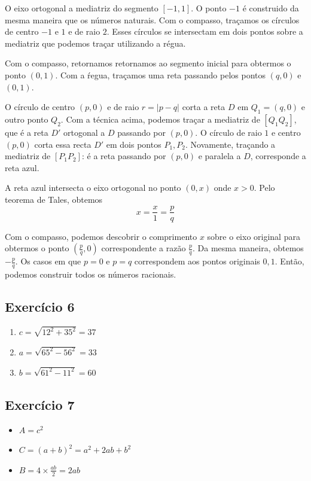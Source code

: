 O eixo ortogonal a mediatriz do segmento $[-1,1]$. O ponto $-1$ é construido da
mesma maneira que os números naturais. Com o compasso, traçamos os círculos de
centro $-1$ e $1$ e de raio $2$. Esses círculos se intersectam em dois pontos
sobre a mediatriz que podemos traçar utilizando a régua.

Com o compasso, retornamos retornamos ao segmento inicial para obtermos o ponto
$(0,1)$. Com a ŕegua, traçamos uma reta passando pelos pontos $(q,0)$ e $(0,1)$.

O círculo de centro $(p,0)$ e de raio $r=|p-q|$ corta a reta $D$ em
$Q_1={(q,0)}$ e outro ponto $Q_2$. Com a técnica acima, podemos traçar a
mediatriz de $[Q_1Q_2]$, que é a reta $D'$
ortogonal a $D$ passando por ${(p,0)}$. O círculo de raio $1$ e centro
$(p,0)$ corta essa recta $D'$ em dois pontos $P_1, P_2$. Novamente, traçando
a mediatriz de $[P_1P_2]$: é a reta passando por $(p,0)$ e paralela a
$D$, corresponde a reta azul.

A reta azul intersecta o eixo ortogonal no ponto
$(0,x)$ onde $x > 0$. Pelo teorema de Tales, obtemos
$$
x = \frac{x}{1} = \frac{p}{q}
$$

Com o compasso, podemos descobrir o comprimento $x$ sobre o eixo original para
obtermos o ponto $\left(\frac{p}{q}, 0 \right)$ correspondente a razão
$\frac{p}{q}$. Da mesma maneira, obtemos $-\frac{p}{q}$.
Os casos em que $p = 0$ e $p = q$ correspondem aos pontos originais  $0, 1$.
Então, podemos construir todos os números racionais.

\subsection*{Exercício 6}

\begin{enumerate}
\item $c = \sqrt{12^2 + 35^2} = 37$
\item $a = \sqrt{65^2 - 56^2} = 33$
\item $b = \sqrt{61^2 - 11^2} = 60$
\end{enumerate}

\subsection*{Exercício 7}

\begin{itemize}
  \item $A = c^2$
  \item $C = \left(a+b\right)^2 = a^2 + {2ab} + b^2$
  \item $B = 4 \times \frac{ab}{2} = {2ab}$
\end{itemize}

